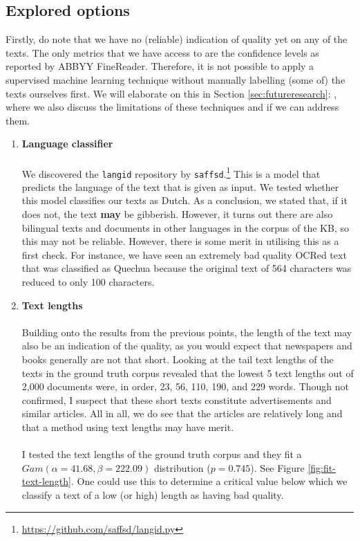 \documentclass{article}
\begin{document}
	\subsection{Explored options}
	Firstly, do note that we have no (reliable) indication of quality yet on any of the texts. The only metrics that we have access to are the confidence levels as reported by ABBYY FineReader. Therefore, it is not possible to apply a supervised machine learning technique without manually labelling (some of) the texts ourselves first. We will elaborate on this in Section \ref{sec:futureresearch}: , where we also discuss the limitations of these techniques and if we can address them.
	
	\begin{enumerate}
		\item \textbf{Language classifier}
		\\ \\
		We discovered the \texttt{langid} repository by \texttt{saffsd}.\footnote{\url{https://github.com/saffsd/langid.py}} This is a model that predicts the language of the text that is given as input. We tested whether this model classifies our texts as Dutch. As a conclusion, we stated that, if it does not, the text \textbf{may} be gibberish. However, it turns out there are also bilingual texts and documents in other languages in the corpus of the KB, so this may not be reliable. However, there is some merit in utilising this as a first check. For instance, we have seen an extremely bad quality OCRed text that was classified as Quechua because the original text of 564 characters was reduced to only 100 characters.
		
		\item \textbf{Text lengths}
		\\ \\
		Building onto the results from the previous points, the length of the text may also be an indication of the quality, as you would expect that newspapers and books generally are not that short. Looking at the tail text lengths of the texts in the ground truth corpus revealed that the lowest 5 text lengths out of 2,000 documents were, in order, 23, 56, 110, 190, and 229 words. Though not confirmed, I suspect that these short texts constitute advertisements and similar articles. All in all, we do see that the articles are relatively long and that a method using text lengths may have merit.
		\\ \\
		I tested the text lengths of the ground truth corpus and they fit a $Gam(\alpha=41.68, \beta=222.09)$ distribution ($p = 0.745$). See Figure \ref{fig:fit-text-length}. One could use this to determine a critical value below which we classify a text of a low (or high) length as having bad quality.
		

\end{enumerate}
\end{document}
